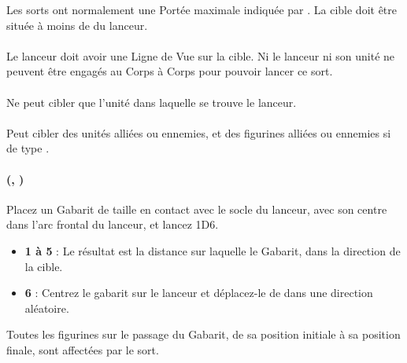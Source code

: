 Les sorts ont normalement une Portée maximale indiquée par \og {} \fg{}. La cible doit être située à moins de  du lanceur.

\paragraph{\missile}

Le lanceur doit avoir une Ligne de Vue sur la cible. Ni le lanceur ni son unité ne peuvent être engagés au Corps à Corps pour pouvoir lancer ce sort.

\paragraph{\castersunit}

Ne peut cibler que l'unité dans laquelle se trouve le lanceur.

\paragraph{\universal}

Peut cibler des unités alliées ou ennemies, et des figurines alliées ou ennemies si de type \focused{}.

\paragraph{\vortex{} (, \template{} )}

Placez un Gabarit de taille  en contact avec le socle du lanceur, avec son centre dans l'arc frontal du lanceur, et lancez 1D6.
\begin{itemize}[label={-}]
\item \textbf{1 à 5} :  Le résultat est la distance sur laquelle le Gabarit, dans la direction de la cible.
\item \textbf{6} : Centrez le gabarit sur le lanceur et déplacez-le de  dans une direction aléatoire.
\end{itemize}

Toutes les figurines sur le passage du Gabarit, de sa position initiale à sa position finale, sont affectées par le sort. 

